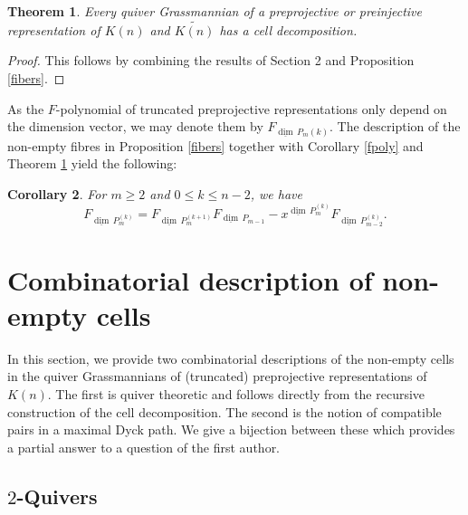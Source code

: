 \documentclass{amsart}
\newtheorem{theorem}{Theorem}[section]
\newtheorem{corollary}[theorem]{Corollary}
\newcommand\udim{{\underline{\dim}\, }}
\begin{document}
\begin{theorem}\label{celldec}
  Every quiver Grassmannian of a preprojective or preinjective representation of $K(n)$ and $\widetilde{K(n)}$ has a cell decomposition.
\end{theorem}
\begin{proof}
This follows by combining the results of Section 2 and Proposition \ref{fibers}.
\end{proof}

As the $F$-polynomial of truncated preprojective representations only depend on the dimension vector, we may denote them by $F_{\udim P_m{(k)}}$. The description of the non-empty fibres in Proposition \ref{fibers} together with Corollary \ref{fpoly} and Theorem \ref{celldec} yield the following:
\begin{corollary}
For $m\geq 2$ and $0\leq k\leq n-2$, we have 
$$F_{\udim P_m^{(k)}}=F_{\udim P_m^{(k+1)}}F_{\udim P_{m-1}}-x^{\udim P_{m}^{(k)}}F_{\udim P_{m-2}^{(k)}}.$$
\end{corollary}


\section{Combinatorial description of non-empty cells}
In this section, we provide two combinatorial descriptions of the non-empty cells in the quiver Grassmannians of (truncated) preprojective representations of $K(n)$.
The first is quiver theoretic and follows directly from the recursive construction of the cell decomposition.
The second is the notion of compatible pairs in a maximal Dyck path.
We give a bijection between these which provides a partial answer to a question of the first author.

\subsection{$2$-Quivers}
\end{document}
